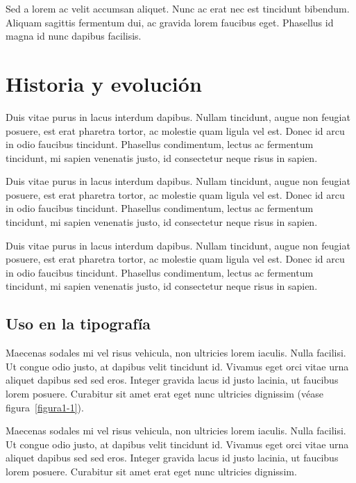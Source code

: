 Sed a lorem ac velit accumsan aliquet. Nunc ac erat nec est tincidunt bibendum. Aliquam sagittis fermentum dui, ac gravida lorem faucibus eget. Phasellus id magna id nunc dapibus facilisis.

\section{Historia y evolución}

Duis vitae purus in lacus interdum dapibus. Nullam tincidunt, augue non feugiat posuere, est erat pharetra tortor, ac molestie quam ligula vel est. Donec id arcu in odio faucibus tincidunt. Phasellus condimentum, lectus ac fermentum tincidunt, mi sapien venenatis justo, id consectetur neque risus in sapien.

Duis vitae purus in lacus interdum dapibus. Nullam tincidunt, augue non feugiat posuere, est erat pharetra tortor, ac molestie quam ligula vel est. Donec id arcu in odio faucibus tincidunt. Phasellus condimentum, lectus ac fermentum tincidunt, mi sapien venenatis justo, id consectetur neque risus in sapien.

Duis vitae purus in lacus interdum dapibus. Nullam tincidunt, augue non feugiat posuere, est erat pharetra tortor, ac molestie quam ligula vel est. Donec id arcu in odio faucibus tincidunt. Phasellus condimentum, lectus ac fermentum tincidunt, mi sapien venenatis justo, id consectetur neque risus in sapien.

\subsection{Uso en la tipografía}

Maecenas sodales mi vel risus vehicula, non ultricies lorem iaculis. Nulla facilisi. Ut congue odio justo, at dapibus velit tincidunt id. Vivamus eget orci vitae urna aliquet dapibus sed sed eros. Integer gravida lacus id justo lacinia, ut faucibus lorem posuere. Curabitur sit amet erat eget nunc ultricies dignissim (véase figura~\ref{figura1-1}).

Maecenas sodales mi vel risus vehicula, non ultricies lorem iaculis. Nulla facilisi. Ut congue odio justo, at dapibus velit tincidunt id. Vivamus eget orci vitae urna aliquet dapibus sed sed eros. Integer gravida lacus id justo lacinia, ut faucibus lorem posuere. Curabitur sit amet erat eget nunc ultricies dignissim.


